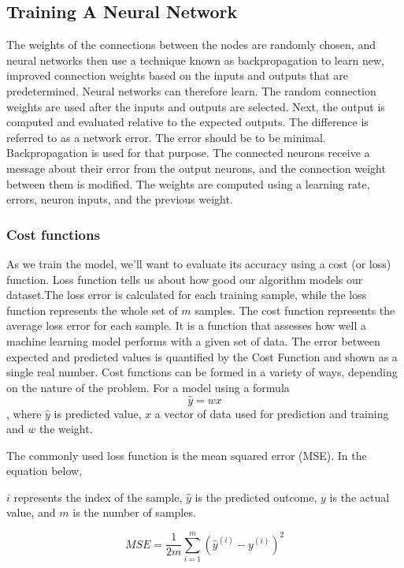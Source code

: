 \subsection{Training A Neural Network}
The weights of the connections between the nodes are randomly chosen, and neural networks then use a technique known as backpropagation to learn new, improved connection weights based on the inputs and outputs that are predetermined. Neural networks can therefore learn.
The random connection weights are used after the inputs and outputs are selected. Next, the output is computed and evaluated relative to the expected outputs. The difference is referred to as a network error.  The error should be to be minimal. Backpropagation is used for that purpose.  The connected neurons receive a message about their error from the output neurons, and the connection weight between them is modified. The weights are computed using a learning rate, errors, neuron inputs, and the previous weight.\\
\subsubsection*{Cost functions}

 As we train the model, we’ll want to evaluate its accuracy using a cost (or loss) function. Loss function tells us about how good our algorithm models our dataset.The loss error is calculated for each training sample, while the loss function represents the whole set of $m$ samples. The cost function represents the average loss error for each sample. It is a function that assesses how well a machine learning model performs with a given set of data. The error between expected and predicted values is quantified by the Cost Function and shown as a single real number. Cost functions can be formed in a variety of ways, depending on the nature of the problem. For a model using a formula 
 \begin{equation*}
 	\hat{y} = wx
 \end{equation*}, where $\hat{y}$ is predicted value, $x$ a vector of data used for prediction and training and $w$ the weight.
 
  
 The commonly used loss function is the mean squared error (MSE).  In the equation below,

$i$ represents the index of the sample,
$\hat{y}$ is the predicted outcome,
$y$ is the actual value, and
$m$ is the number of samples.

\begin{equation}
 MSE = \frac{1}{2m} \sum_{i=1}^{m} (\hat{y}^{(i)} - y^{(i)})^2
\end{equation}


